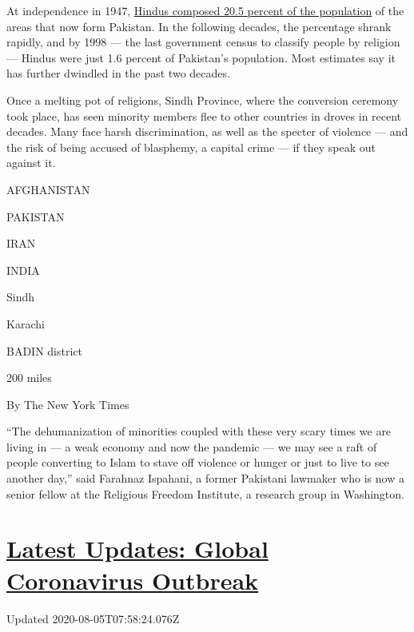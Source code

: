 At independence in 1947,
\href{https://theprint.in/opinion/modi-critics-decry-india-mistreating-minorities-but-cant-whitewash-pak-islamisation/355536/}{Hindus
composed 20.5 percent of the population} of the areas that now form
Pakistan. In the following decades, the percentage shrank rapidly, and
by 1998 --- the last government census to classify people by religion
--- Hindus were just 1.6 percent of Pakistan's population. Most
estimates say it has further dwindled in the past two decades.

Once a melting pot of religions, Sindh Province, where the conversion
ceremony took place, has seen minority members flee to other countries
in droves in recent decades. Many face harsh discrimination, as well as
the specter of violence --- and the risk of being accused of blasphemy,
a capital crime --- if they speak out against it.

AFGHANISTAN

PAKISTAN

IRAN

INDIA

Sindh

Karachi

BADIN district

200 miles

By The New York Times

``The dehumanization of minorities coupled with these very scary times
we are living in --- a weak economy and now the pandemic --- we may see
a raft of people converting to Islam to stave off violence or hunger or
just to live to see another day,'' said Farahnaz Ispahani, a former
Pakistani lawmaker who is now a senior fellow at the Religious Freedom
Institute, a research group in Washington.

\hypertarget{latest-updates-global-coronavirus-outbreak}{%
\section{\texorpdfstring{\href{https://www.nytimes.com/2020/08/04/world/coronavirus-cases.html?action=click\&pgtype=Article\&state=default\&region=MAIN_CONTENT_1\&context=storylines_live_updates}{Latest
Updates: Global Coronavirus
Outbreak}}{Latest Updates: Global Coronavirus Outbreak}}\label{latest-updates-global-coronavirus-outbreak}}

Updated 2020-08-05T07:58:24.076Z

